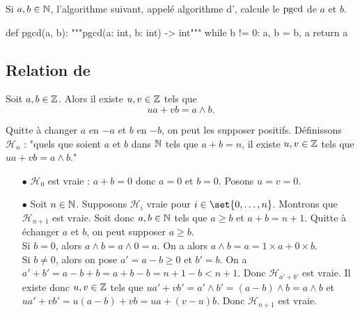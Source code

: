 \documentclass{magnolia}
\begin{document}
\begin{remarqueUnique}
\remarque Si $a,b\in\mathbb{N}$, l'algorithme suivant, appelé algorithme d', calcule le $\operatorname{pgcd}$ de $a$ et $b$.
\begin{pythoncodeline}
def pgcd(a, b):
    """pgcd(a: int, b: int) -> int"""
    while b != 0:
        a, b = b, a %
    return a
\end{pythoncodeline}
\end{remarqueUnique}

\subsection{Relation de }

\begin{proposition}
Soit $a,b\in\mathbb{Z}$. Alors il existe $u,v\in\mathbb{Z}$ tels que
\[ua+vb=a\wedge b.\]
\end{proposition}

\begin{preuve}
Quitte à changer $a$ en $-a$ et $b$ en $-b$, on peut les supposer positifs. Définissons $\mathcal{H}_n$ : "quels que soient $a$ et $b$ dans $\mathbb{N}$ tels que $a+b=n$, il existe $u,v\in \mathbb{Z}$ tels que $ua+vb=a\wedge b$."
\begin{itemize}
\item[$\bullet$] $\mathcal{H}_0$ est vraie : $a+b=0$ donc $a=0$ et $b=0$. Posons $u=v=0$.
\item[$\bullet$] Soit $n\in \mathbb{N}$. Supposons $\mathcal{H}_i$ vraie pour $i\in \set{0,\ldots,n}$. Montrons que $\mathcal{H}_{n+1}$ est vraie. Soit donc $a,b\in \mathbb{N}$ tels que $a\geq b$ et $a+b=n+1$. Quitte à échanger $a$ et $b$, on peut supposer $a\geq b$.\\
Si $b=0$, alors $a\wedge b=a\wedge 0=a$. On a alors $a\wedge b=a=1\times a+0\times b$.\\
Si $b\neq 0$, alors on pose $a'=a-b\geq 0$ et $b'=b$. On a $a'+b'=a-b+b=a+b-b=n+1-b<n+1$. Donc  $\mathcal{H}_{a'+b'}$ est vraie. Il existe donc $u,v\in \mathbb{Z}$ tels que $ua'+vb'=a'\wedge b'=(a-b)\wedge b=a\wedge b$ et $ua'+vb'=u(a-b)+vb=ua+(v-u)b$. Donc $\mathcal{H}_{n+1}$ est vraie.
\end{itemize}
\end{preuve}
\end{document}

